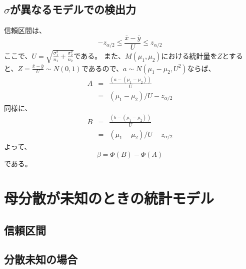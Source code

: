 \subsection{$\sigma$が異なるモデルでの検出力}
信頼区間は、
\begin{equation*}
    -z_{\alpha/2} \leq \frac{\bar{x}-\bar{y}}{U} \leq z_{\alpha/2}
\end{equation*}
ここで、$U=\sqrt{\frac{\sigma^2_1}{n_1}+\frac{\sigma^2_2}{n_2}}$である。
また、$M(\mu_1,\mu_2)$における統計量を$Z$とすると、$Z = \frac{\bar{x}-\bar{y}}{U}\sim N(0,1)$であるので、$a \sim N(\mu_1-\mu_2,U^2)$ならば、
\begin{eqnarray*}
    A &=& \frac{(a-(\mu_1-\mu_2))}{U} \\
        &=& (\mu_1-\mu_2)/U-z_{\alpha/2}
\end{eqnarray*}
同様に、
\begin{eqnarray*}
    B &=& \frac{(b-(\mu_1-\mu_2))}{U} \\
        &=& (\mu_1-\mu_2)/U-z_{\alpha/2}
\end{eqnarray*}
よって、
\begin{equation*}
    \beta = \varPhi(B)-\varPhi(A)
\end{equation*}
である。



\section{母分散が未知のときの統計モデル}


\subsection{信頼区間}





\subsection{分散未知の場合}






